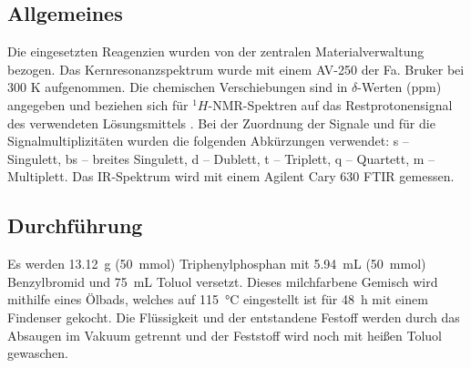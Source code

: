 \subsection{Allgemeines}
Die eingesetzten Reagenzien wurden von der zentralen Materialverwaltung bezogen. 
Das Kernresonanzspektrum wurde mit einem AV-250 der Fa. Bruker bei 300 K aufgenommen. \newline 
Die chemischen Verschiebungen sind in $\delta$-Werten (ppm) angegeben und beziehen sich für $^1H$-NMR-Spektren auf das Restprotonensignal des verwendeten Lösungsmittels . 
Bei der Zuordnung der Signale und für die Signalmultiplizitäten wurden die folgenden Abkürzungen verwendet: s – Singulett, bs – breites Singulett, d – Dublett, t – Triplett, q – Quartett, m – Multiplett.
Das IR-Spektrum wird mit einem Agilent Cary 630 FTIR gemessen. 

\subsection{Durchführung}
Es werden \SI{13.12}{\gram} (\SI{50}{\milli\mole}) Triphenylphosphan mit \SI{5.94}{\milli\liter} (\SI{50}{\milli\mole}) Benzylbromid und \SI{75}{\milli\liter} Toluol versetzt. Dieses milchfarbene Gemisch wird mithilfe eines Ölbads, welches auf \SI{115}{\degreeCelsius} eingestellt ist für \SI{48}{\hour} mit einem Findenser gekocht. 
Die Flüssigkeit und der entstandene Festoff werden durch das Absaugen im Vakuum getrennt und der Feststoff wird noch mit heißen Toluol gewaschen.
